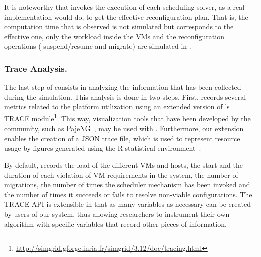 It is noteworthy that \vmps invokes the execution of each scheduling
solver, as a real implementation would do, to get the effective
reconfiguration plan.  That is, the computation time that is observed
is not simulated but corresponds to the effective one, only the
workload inside the VMs and the reconfiguration operations (\ie
suspend/resume and migrate) are simulated in \sg. 

\subsubsection{Trace Analysis.}
\label{subsec:traces-analysis}

The last step of \vmps consists in analyzing the information that has
been collected during the simulation.
This analysis is done in two steps. First, \vmps records several
metrics related to the platform
utilization %
using an extended version of \sg's TRACE
module\footnote{\url{http://simgrid.gforge.inria.fr/simgrid/3.12/doc/tracing.html}}.
This way, visualization tools that have been developed by the \sg
community, such as PajeNG~\cite{pageng:www}, may be used with
\vmps. Furthermore, our extension enables the creation of a JSON trace
file, which is used to represent resource usage by figures generated
using the R statistical environment~\cite{R:Bloomfield:2014}.

By default, \vmps records the load of the different VMs and hosts, the
start and the duration of each violation of VM requirements in
the system, the number of migrations, the number of times the
scheduler mechanism has been invoked and the number of times it
succeeds or fails to resolve non-viable configurations.
%
The TRACE API is extensible in that as many variables as necessary can
be created by users of our system, thus allowing researchers to
instrument their own algorithm with specific variables that record
other pieces of information.




